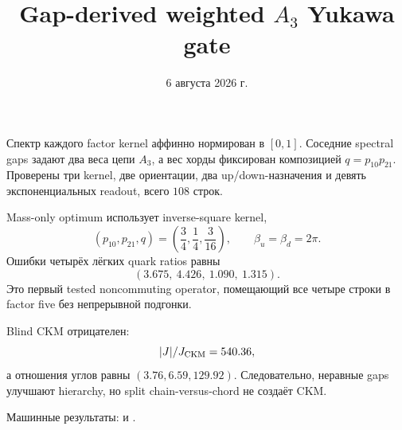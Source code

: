 \documentclass[12pt,a4paper]{article}
\title{Gap-derived weighted \(A_3\) Yukawa gate}
\author{}
\date{6 августа 2026 г.}
\begin{document}
\maketitle

Спектр каждого factor kernel аффинно нормирован в \([0,1]\). Соседние
spectral gaps задают два веса цепи \(A_3\), а вес хорды фиксирован
композицией \(q=p_{10}p_{21}\). Проверены три kernel, две ориентации, два
up/down-назначения и девять экспоненциальных readout, всего \(108\) строк.

Mass-only optimum использует inverse-square kernel,
\[
 (p_{10},p_{21},q)=\left(\frac34,\frac14,\frac3{16}\right),
 \qquad \beta_u=\beta_d=2\pi.
\]
Ошибки четырёх лёгких quark ratios равны
\[
 (3.675,\ 4.426,\ 1.090,\ 1.315).
\]
Это первый tested noncommuting operator, помещающий все четыре строки в
factor five без непрерывной подгонки.

Blind CKM отрицателен:
\[
 |J|/J_{\rm CKM}=540.36,
\]
а отношения углов равны \((3.76,6.59,129.92)\). Следовательно, неравные gaps
улучшают hierarchy, но split chain-versus-chord не создаёт CKM.

Машинные результаты:
 и
.
\end{document}

